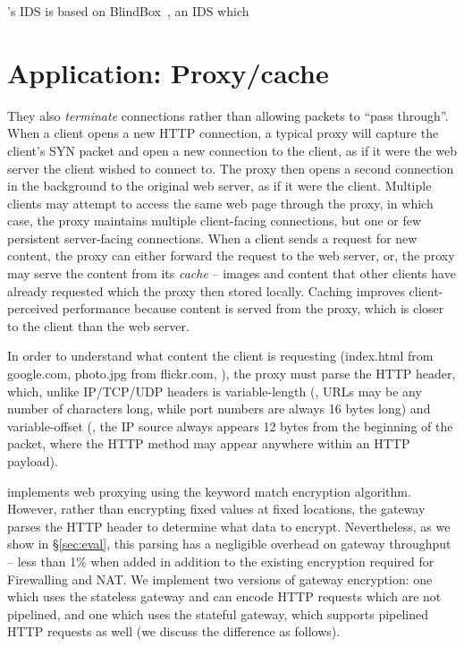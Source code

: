 \sys's IDS is based on BlindBox~\cite{blindbox}, an IDS which 

\section{Application: Proxy/cache}\label{s:proxy}
They also {\it terminate} connections rather than allowing packets to ``pass through''.
When a client opens a new HTTP connection, a typical proxy will capture the client's SYN packet and open a new connection to the client, as if it were the web server the client wished to connect to. 
The proxy then opens a second connection in the background to the original web server, as if it were the client. 
Multiple clients may attempt to access the same web page through the proxy, in which case, the proxy maintains multiple client-facing connections, but one or few persistent server-facing connections.
When a client sends a request for new content, the proxy can either forward the request to the web server, or, the proxy may serve the content from its {\it cache} -- images and content that other clients have already requested which the proxy then stored locally. 
Caching improves client-perceived performance because content is served from the proxy, which is closer to the client than the web server.

In order to understand what content the client is requesting (index.html from google.com, photo.jpg from flickr.com, \etc{}), the proxy must parse the HTTP header, which, unlike IP/TCP/UDP headers is variable-length (\eg{}, URLs may be any number of characters long, while port numbers are always 16 bytes long) and variable-offset (\eg{}, the IP source always appears 12 bytes from the beginning of the packet, where the HTTP method may appear anywhere within an HTTP payload).

\sys implements web proxying using the keyword match encryption algorithm. 
However, rather than encrypting fixed values at fixed locations, the \sys gateway parses the HTTP header to determine what data to encrypt.
Nevertheless, as we show in \S\ref{sec:eval}, this parsing has a negligible overhead on gateway throughput -- less than 1\% when added in addition to the existing encryption required for Firewalling and NAT.
We implement two versions of gateway encryption: one which uses the stateless gateway and can encode HTTP requests which are not pipelined, and one which uses the stateful gateway, which supports pipelined HTTP requests as well (we discuss the difference as follows).

